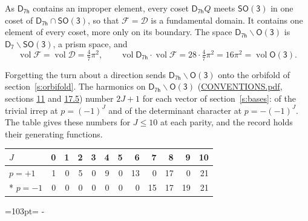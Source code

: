 \documentclass[10pt,a4paper]{article}
\newcommand{\needspace}[1]{\par\penalty-100\begingroup\dimen0=#1\relax\dimen2=\pagegoal
  \advance\dimen2-\pagetotal\ifdim\dimen0>\dimen2\relax\ifdim\dimen2>0pt\vfil\break\fi\fi
  \endgroup}
\numberwithin{equation}{section}
\newcommand{\grp}[1]{\mathsf{#1}}
\newcommand{\vol}{\operatorname{vol}}
\newcommand{\fcell}{\mathcal{D}}
\newcommand{\fdomain}{\mathcal{F}}
\begin{document}
\leavevmode\label{n:set.fundamental}As $\grp{D_{7h}}$ contains an improper element, every coset $\grp{D_{7h}}Q$ meets \href{SO3.pdf}{$\grp{SO(3)}$} in one coset of $\grp{D_{7h}} \cap \grp{SO(3)}$, so that $\fdomain = \fcell$ is a fundamental domain. It contains one element of every coset, more only on its boundary.
The space $\grp{D_{7h}}\backslash\grp{O(3)}$ is $\grp{D_{7}}\backslash\grp{SO(3)}$, a prism space, and
\begin{equation}\label{e:volume}\vol\fdomain = \vol\fcell = \tfrac{4}{7}\pi^2,\qquad \vol\grp{D_{7h}}\cdot\vol\fdomain = 28\cdot \tfrac{4}{7}\pi^2 = 16\pi^2 = \vol\grp{O(3)}.\end{equation}

Forgetting the turn about a direction sends $\grp{D_{7h}}\backslash\grp{O(3)}$ onto the orbifold of section~\ref{s:orbifold}.
The harmonics on $\grp{D_{7h}}\backslash\grp{O(3)}$ (\href{../../CONVENTIONS.pdf}{CONVENTIONS.pdf}, sections \href{../../CONVENTIONS.pdf\#conv.11}{11} and \href{../../CONVENTIONS.pdf\#conv.17.5}{17.5}) number $2J + 1$ for each vector of section~\ref{s:bases}: of the trivial irrep at $p = (-1)^J$ and of the determinant character at $p = -(-1)^J$. The table gives these numbers for $J \le 10$ at each parity, and the record holds their generating functions.
{\small\setlength{\tabcolsep}{4pt}\begin{longtable}{@{}lrrrrrrrrrrr@{}}\toprule
$J$ & 0 & 1 & 2 & 3 & 4 & 5 & 6 & 7 & 8 & 9 & 10\\\midrule\endhead
\bottomrule\endfoot\endlastfoot
$p = +1$ & 1 & 0 & 5 & 0 & 9 & 0 & 13 & 0 & 17 & 0 & 21\\*
$p = -1$ & 0 & 0 & 0 & 0 & 0 & 0 & 0 & 15 & 17 & 19 & 21\\
\bottomrule\end{longtable}}
\needspace{103pt}
\end{document}
